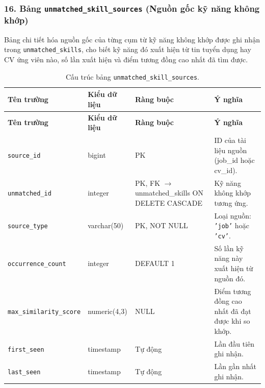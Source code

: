 \subsubsection*{16. Bảng \texttt{unmatched\_\allowbreak skill\_\allowbreak sources} (Nguồn gốc kỹ năng không khớp)}

Bảng chi tiết hóa nguồn gốc của từng cụm từ kỹ năng không khớp được ghi nhận trong \texttt{unmatched\_skills}, cho biết kỹ năng đó xuất hiện từ tin tuyển dụng hay CV ứng viên nào, số lần xuất hiện và điểm tương đồng cao nhất đã tìm được.

\begin{footnotesize}\begin{longtable}{|L{3.5cm}|L{2.0cm}|L{3.0cm}|L{5.5cm}|}
\caption{Cấu trúc bảng \texttt{unmatched\_\allowbreak skill\_\allowbreak sources}.}
\label{tab:unmatched_skill_sources} \\
\hline
\textbf{Tên trường} & \textbf{Kiểu dữ liệu} & \textbf{Ràng buộc} & \textbf{Ý nghĩa} \\
\hline
\endfirsthead
\hline
\textbf{Tên trường} & \textbf{Kiểu dữ liệu} & \textbf{Ràng buộc} & \textbf{Ý nghĩa} \\
\hline
\endhead
\texttt{source\_id} & bigint & PK & ID của tài liệu nguồn (job\_id hoặc cv\_id). \\
\hline
\texttt{unmatched\_id} & integer & PK, FK $\rightarrow$ unmatched\_skills ON DELETE CASCADE & Kỹ năng không khớp tương ứng. \\
\hline
\texttt{source\_type} & varchar(50) & PK, NOT NULL & Loại nguồn: \texttt{'job'} hoặc \texttt{'cv'}. \\
\hline
\texttt{occurrence\_count} & integer & DEFAULT 1 & Số lần kỹ năng này xuất hiện từ nguồn đó. \\
\hline
\texttt{max\_similarity\_score} & numeric(4,3) & NULL & Điểm tương đồng cao nhất đã đạt được khi so khớp. \\
\hline
\texttt{first\_seen} & timestamp & Tự động & Lần đầu tiên ghi nhận. \\
\hline
\texttt{last\_seen} & timestamp & Tự động & Lần gần nhất ghi nhận. \\
\hline
\end{longtable}
\end{footnotesize}
